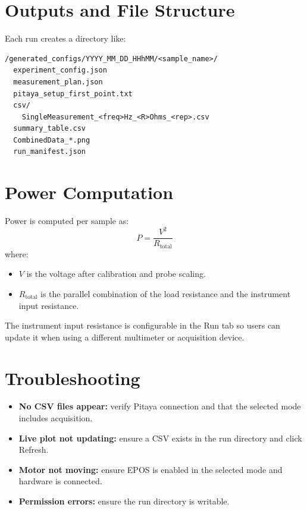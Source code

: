 \documentclass[11pt,a4paper]{article}
\begin{document}
\section{Outputs and File Structure}
Each run creates a directory like:
\begin{verbatim}
/generated_configs/YYYY_MM_DD_HHhMM/<sample_name>/
  experiment_config.json
  measurement_plan.json
  pitaya_setup_first_point.txt
  csv/
    SingleMeasurement_<freq>Hz_<R>Ohms_<rep>.csv
  summary_table.csv
  CombinedData_*.png
  run_manifest.json
\end{verbatim}

\section{Power Computation}
Power is computed per sample as:
\[ P = \frac{V^2}{R_{\text{total}}} \]
where:
\begin{itemize}[leftmargin=*]
\item $V$ is the voltage after calibration and probe scaling.
\item $R_{\text{total}}$ is the parallel combination of the load resistance and the instrument input resistance.
\end{itemize}
The instrument input resistance is configurable in the Run tab so users can update it when using a different multimeter or acquisition device.

\section{Troubleshooting}
\begin{itemize}[leftmargin=*]
\item \textbf{No CSV files appear:} verify Pitaya connection and that the selected mode includes acquisition.
\item \textbf{Live plot not updating:} ensure a CSV exists in the run directory and click Refresh.
\item \textbf{Motor not moving:} ensure EPOS is enabled in the selected mode and hardware is connected.
\item \textbf{Permission errors:} ensure the run directory is writable.
\end{itemize}
\end{document}
